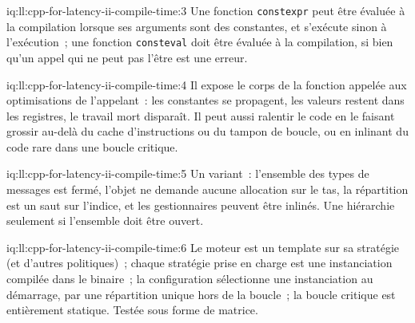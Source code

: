 \begin{solution}{iq:ll:cpp-for-latency-ii-compile-time:3}
Une fonction \texttt{constexpr} peut être évaluée à la compilation lorsque ses arguments sont des constantes, et s'exécute sinon à
l'exécution~; une fonction \texttt{consteval} doit être évaluée à la compilation, si bien qu'un appel qui ne peut pas l'être est une erreur.
\end{solution}

\begin{solution}{iq:ll:cpp-for-latency-ii-compile-time:4}
Il expose le corps de la fonction appelée aux optimisations de l'appelant~: les constantes se propagent, les valeurs restent dans les registres, le travail mort
disparaît. Il peut aussi ralentir le code en le faisant grossir au-delà du cache d'instructions ou du tampon de boucle, ou en inlinant du code rare
dans une boucle critique.
\end{solution}

\begin{solution}{iq:ll:cpp-for-latency-ii-compile-time:5}
Un variant~: l'ensemble des types de messages est fermé, l'objet ne demande aucune allocation sur le tas, la répartition est un saut sur l'indice, et
les gestionnaires peuvent être inlinés. Une hiérarchie seulement si l'ensemble doit être ouvert.
\end{solution}

\begin{solution}{iq:ll:cpp-for-latency-ii-compile-time:6}
Le moteur est un template sur sa stratégie (et d'autres politiques)~; chaque stratégie prise en charge est une instanciation compilée dans
le binaire~; la configuration sélectionne une instanciation au démarrage, par une répartition unique hors de la boucle~; la boucle critique
est entièrement statique. Testée sous forme de matrice.
\end{solution}
